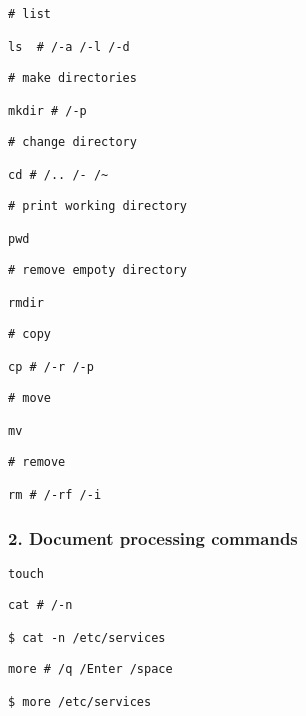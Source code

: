 \documentclass[
]{article}
\begin{document}
\begin{verbatim}
# list

ls  # /-a /-l /-d
\end{verbatim}

\begin{verbatim}
# make directories

mkdir # /-p
\end{verbatim}

\begin{verbatim}
# change directory

cd # /.. /- /~
\end{verbatim}

\begin{verbatim}
# print working directory

pwd 
\end{verbatim}

\begin{verbatim}
# remove empoty directory

rmdir
\end{verbatim}

\begin{verbatim}
# copy

cp # /-r /-p
\end{verbatim}

\begin{verbatim}
# move

mv 
\end{verbatim}

\begin{verbatim}
# remove

rm # /-rf /-i
\end{verbatim}

\hypertarget{header-n88}{%
\subsubsection{2. Document processing commands}\label{header-n88}}

\begin{verbatim}
touch
\end{verbatim}

\begin{verbatim}
cat # /-n

$ cat -n /etc/services
\end{verbatim}

\begin{verbatim}
more # /q /Enter /space

$ more /etc/services
\end{verbatim}
\end{document}
